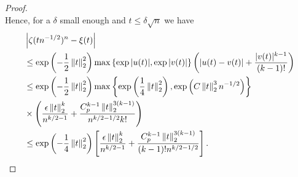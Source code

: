 \begin{proof}
\begin{equation*}
    \end{equation*}
    Hence, for a $\delta$ small enough and $t \leq \delta\sqrt{n}$ we have
    \begin{align*}
        &\left|\zeta(t n^{-1/2})^n - \xi(t)\right| \\
        &\leq \exp\left(-\frac{1}{2}\left\lVert t\right\rVert_2^2\right) \max \left\{ \exp{|u(t)|}, \exp{|v(t)|} \right\}\left(\left|u(t) - v(t)\right| + \frac{|v(t)|^{k-1}}{(k-1)!}\right)\\
        &\leq \exp\left(-\frac{1}{2}\left\lVert t\right\rVert_2^2\right)
            \max \left\{ 
                \exp\left(\frac{1}{4}\left\lVert t\right\rVert_2^2\right),
                \exp\left(C \left\lVert t\right\rVert_2^3 n^{-1/2}\right)
            \right\}\\
        & \times \left(
                \frac{\epsilon\left\lVert t\right\rVert_2^k}{n^{k/2-1}}
                +
                \frac{C_p^{k-1} \left\lVert t\right\rVert_2^{3(k-1)} }{n^{k/2-1/2} k!}
              \right)\\
        & \leq \exp\left(-\frac{1}{4}\left\lVert t\right\rVert_2^2\right)\left[ \frac{\epsilon\left\lVert t\right\rVert_2^k}{n^{k/2-1}} + \frac{C_p^{k-1}\left\lVert t\right\rVert_2^{3(k-1)}}{(k-1)!n^{k/2-1/2}} \right].
    \end{align*}
\end{proof}